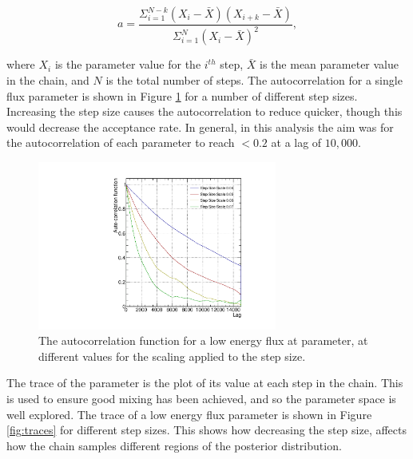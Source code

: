 \begin{equation}
a = \frac{\Sigma^{N-k}_{i=1}(X_i - \bar{X})(X_{i+k} - \bar{X})}{\Sigma^N_{i=1}(X_i-\bar{X})^2},
\end{equation}

where $X_i$ is the parameter value for the $i^{th}$ step, $\bar{X}$ is the mean parameter value in the chain, and $N$ is the total number of steps. The autocorrelation for a single flux parameter is shown in Figure \ref{fig:autocorr} for a number of different step sizes. Increasing the step size causes the autocorrelation to reduce quicker, though this would decrease the acceptance rate. In general, in this analysis the aim was for the autocorrelation of each parameter to reach $<0.2$ at a lag of $10,000$.

\begin{figure}[!htbp]
\centering
\includegraphics*[width=0.7\textwidth,clip]{figs/autoCorr}
\caption{The autocorrelation function for a low energy flux at parameter, at different values for the scaling applied to the step size.}\label{fig:autocorr}
\end{figure}

The trace of the parameter is the plot of its value at each step in the chain. This is used to ensure good mixing has been achieved, and so the parameter space is well explored. The trace of a low energy flux parameter is shown in Figure \ref{fig:traces} for different step sizes. This shows how decreasing the step size, affects how the chain samples different regions of the posterior distribution.

